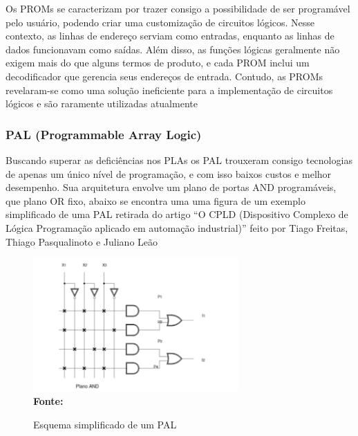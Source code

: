 Os PROMs se caracterizam por trazer consigo a possibilidade de ser programável pelo usuário, podendo criar uma customização de circuitos lógicos. Nesse contexto, as linhas de endereço serviam como entradas, enquanto as linhas de dados funcionavam como saídas. Além disso, as funções lógicas geralmente não exigem mais do que alguns termos de produto, e cada PROM inclui um decodificador que gerencia seus endereços de entrada. Contudo, as PROMs revelaram-se como uma solução ineficiente para a implementação de circuitos lógicos e são raramente utilizadas atualmente
\cite{Aragao1998}

\subsubsection{\esp PAL (Programmable Array Logic)}

Buscando superar as deficiências nos PLAs os PAL trouxeram consigo tecnologias de apenas um único nível de programação, e com isso baixos custos e melhor desempenho. Sua arquitetura envolve um plano de portas AND programáveis, que plano OR fixo, abaixo se encontra uma uma figura de um exemplo simplificado de uma PAL retirada do artigo “O CPLD (Dispositivo Complexo de Lógica Programação aplicado em automação industrial)” feito por Tiago Freitas, Thiago Pasqualinoto e Juliano Leão
\cite{Freitas2015}

\begin{figure}[ht]
	\centering	
	\caption{Esquema simplificado de um PAL}
	\vspace{-0.4cm}
	\includegraphics[width=0.7\textwidth]{figuras/Figura2.png}
	 \vspace{-0.2cm}
	\\\textbf{\footnotesize Fonte:  }
	\label{fig:figura2}
\end{figure}
\vspace{-0.5cm}

   \newpage

